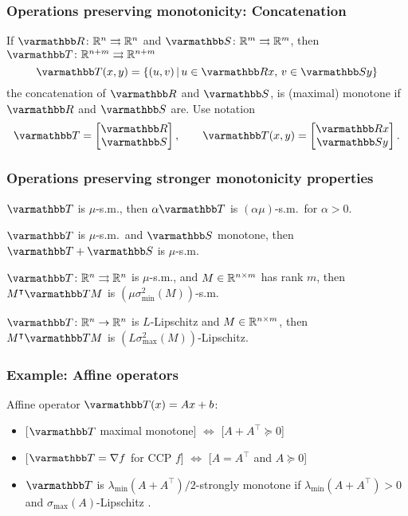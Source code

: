 \documentclass[10pt,mathserif]{beamer}
\begin{document}
\begin{frame}
\frametitle{Operations preserving monotonicity: Concatenation}
If $\opR \colon\reals^n\rightrightarrows \reals^n$ and $\opS \colon\reals^m\rightrightarrows \reals^m$,
then  $\opT \colon\reals^{n+m}\rightrightarrows\reals^{n+m}$
\[
\opT (x,y)=\{
(u,v)\,|\,
u\in \opR x,\,v\in \opS y
\}
\]
the concatenation of $\opR$ and $\opS$,
is (maximal) monotone if $\opR $ and $\opS $ are.
Use notation
\[
\opT =\begin{bmatrix}
\opR \\\opS
\end{bmatrix},
\qquad
\opT (x,y)=
\begin{bmatrix}
\opR x\\\opS y
\end{bmatrix}.
\]

\end{frame}



\begin{frame}
\frametitle{Operations preserving stronger monotonicity properties}
$\opT $ is $\mu$-s.m., then $\alpha\opT$ is $(\alpha \mu)$-s.m.\ for $\alpha >0$.
\vspace{0.2in}


$\opT $ is $\mu$-s.m.\ and $\opS $ monotone, then
$\opT +\opS $ is $\mu$-s.m.
\vspace{0.2in}

$\opT \colon\reals^n\rightrightarrows\reals^n$ is $\mu$-s.m., and $M\in \mathbb{R}^{n\times m}$ has rank $m$, then $M^\intercal\opT  M$ is
$(\mu\sigma^2_\mathrm{min}(M))$-s.m.
\vspace{0.2in}

$\opT  \colon\reals^n\rightarrow\reals^n$ is $L$-Lipschitz and $M\in \mathbb{R}^{n\times m}$, then $M^\intercal\opT  M$ is  $(L \sigma_\mathrm{max}^2(M))$-Lipschitz.

\end{frame}


\begin{frame}
\frametitle{Example: Affine operators}
Affine operator $\opT (x) =Ax+b$:
\begin{itemize}
\item

[$\opT$ maximal monotone] $\Leftrightarrow$ [$A+A^\intercal \succeq 0$]
\item

[$\opT=\nabla f$ for CCP $f$] $\Leftrightarrow$ [$A=A^\intercal$ and $A\succeq 0$]
\item
$\opT$ is $\lambda_\mathrm{min}(A+A^\intercal)/2$-strongly monotone if $\lambda_\mathrm{min}(A+A^\intercal)>0$ \\
and $\sigma_\mathrm{max}(A)$-Lipschitz .
\end{itemize}
\end{frame}
\end{document}
